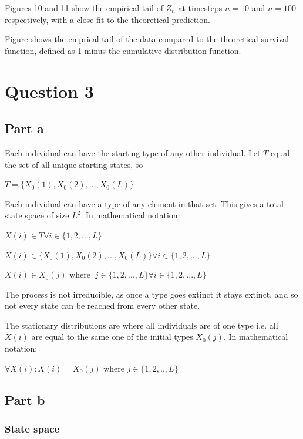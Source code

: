 \documentclass{article}
\begin{document}
Figures 10 and 11 show the empirical tail of $Z_n$ at timesteps $n=10$ and $n=100$ respectively, with a close fit to the theoretical prediction. 




Figure shows the emprical tail of the data compared to the theoretical survival function, defined as 1 minus the cumulative distribution function.




\section{Question 3}

\subsection{Part a}

Each individual can have the starting type of any other individual. Let $T$ equal the set of all unique starting states, so 

$T = \{X_0(1), X_0(2), . . . , X_0(L)\}$

Each individual can have a type of any element in that set. This gives a total state space of size $L^2$. In mathematical notation:

$X(i) \in T \forall i \in \{1,2,...,L\}$ 


$X(i) \in \{X_0(1), X_0(2), . . . , X_0(L)\} \forall i \in \{1,2,...,L\}$ 

$X(i) \in X_0(j) \text{ where } \ j \in \{1,2,...,L\} \forall i \in\{1,2,...,L\}$ 



The process is not irreducible, as once a type goes extinct it stays extinct, and so not every state can be reached from every other state.

The stationary distributions are where all individuals are of one type i.e. all $X(i)$ are equal to the same one of the initial types $X_0(j)$. In mathematical notation:

$ \forall X(i) : X(i) = X_0(j) \text{ where } j \in \{1,2,..,L\}$  

\subsection{Part b}

\subsubsection{State space}
\end{document}
